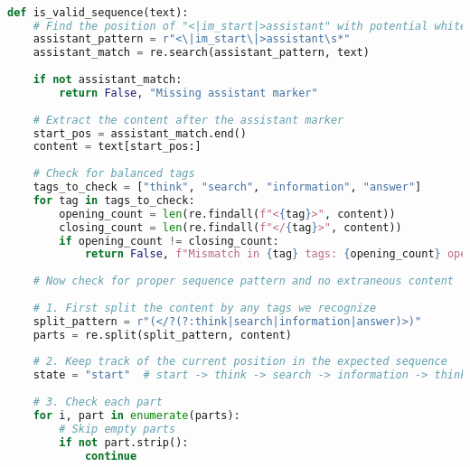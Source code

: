 \begin{lstlisting}[language=Python, caption=Format Reward Code., label={lst:example_python}, 
    basicstyle=\ttfamily\small, 
    keywordstyle=\color{blue}, 
    stringstyle=\color{red}, 
    commentstyle=\color{gray}, 
    showstringspaces=false, 
    breaklines=true]

def is_valid_sequence(text):
    # Find the position of "<|im_start|>assistant" with potential whitespace
    assistant_pattern = r"<\|im_start\|>assistant\s*"
    assistant_match = re.search(assistant_pattern, text)
    
    if not assistant_match:
        return False, "Missing assistant marker"
    
    # Extract the content after the assistant marker
    start_pos = assistant_match.end()
    content = text[start_pos:]
    
    # Check for balanced tags
    tags_to_check = ["think", "search", "information", "answer"]
    for tag in tags_to_check:
        opening_count = len(re.findall(f"<{tag}>", content))
        closing_count = len(re.findall(f"</{tag}>", content))
        if opening_count != closing_count:
            return False, f"Mismatch in {tag} tags: {opening_count} opening vs {closing_count} closing tags"
    
    # Now check for proper sequence pattern and no extraneous content
    
    # 1. First split the content by any tags we recognize
    split_pattern = r"(</?(?:think|search|information|answer)>)"
    parts = re.split(split_pattern, content)
    
    # 2. Keep track of the current position in the expected sequence
    state = "start"  # start -> think -> search -> information -> think -> ... -> answer -> end
    
    # 3. Check each part
    for i, part in enumerate(parts):
        # Skip empty parts
        if not part.strip():
            continue
            

\end{lstlisting}
